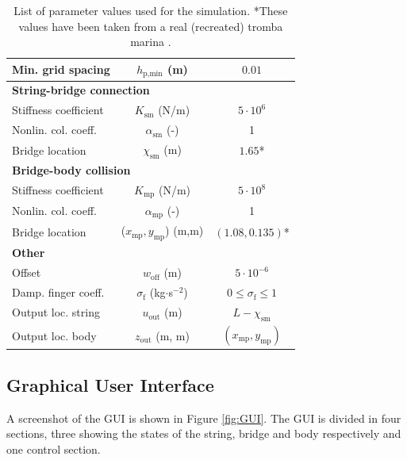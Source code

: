 \documentclass[dvipsnames, pdftex]{article}
\def\stringx{\chi}
\def\um{w}
\begin{document}
\begin{table}[t]
\begin{center}
\begin{tabular}{|l|c|c|}
    Min. grid spacing & $h_{\text{p},\text{min}}$ (m)& $0.01$\\ \hline
    \multicolumn{3}{|l|}{\bf String-bridge connection}\\\hline
    Stiffness coefficient & $K_\text{sm}$ (N/m) & $5\cdot10^{6}$\\
    Nonlin. col. coeff. &$\alpha_\text{sm}$ (-) & 1\\
    Bridge location & $\stringx_\text{sm}$ (m)& $1.65$*\\
    \hline
    \multicolumn{3}{|l|}{\bf Bridge-body collision}\\\hline
    Stiffness coefficient & $K_\text{mp}$ (N/m) & $5\cdot10^{8}$\\
    Nonlin. col. coeff. &$\alpha_\text{mp}$ (-) & 1\\
    Bridge location & ($x_\text{mp},y_\text{mp}$) (m,m)& $(1.08,0.135)$*\\\hline
    \multicolumn{3}{|l|}{\bf Other}\\\hline
    Offset & $\um_\text{off}$ (m) & $5\cdot 10^{-6}$\\
    Damp. finger coeff. &$\sigma_\text{f}$ (kg$\cdot$s$^{-2}$)&$0\leq \sigma_\text{f} \leq 1$\\
    Output loc. string & $u_\text{out}$ (m) & $L - \stringx_\text{sm}$\\
    Output loc. body & $z_\text{out}$ (m, m) & $(x_\text{mp},y_\text{mp})$\\
    \hline
\end{tabular}
\caption{List of parameter values used for the simulation. *These values have been taken from a real (recreated) tromba marina \cite{Baldwin2016:SMC2020}.}
\end{center}
\end{table}

\subsection{Graphical User Interface}\label{sec:GUI}
A screenshot of the GUI is shown in Figure \ref{fig:GUI}. The GUI is divided in four sections, three showing the states of the string, bridge and body respectively and one control section. 
\end{document}
